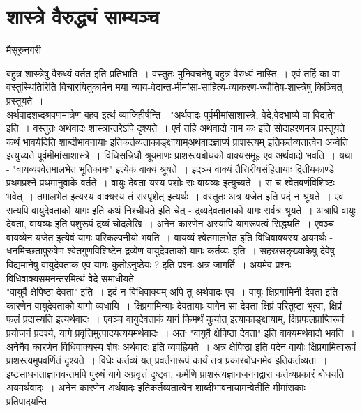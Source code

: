 {\fontsize{15}{17}\selectfont
\presetvalues
\chapter{शास्त्रे वैरुद्ध्यं साम्यञ्च} 

\begin{center}
\smallskip

मैसूरुनगरी
\addrule
\end{center}

बहुत्र शास्त्रेषु वैरुध्यं वर्तत इति प्रतिभाति~। वस्तुतः मुनिवचनेषु बहुत्र वैरुध्यं नास्ति~। एवं तर्हि का वा वस्तुस्थितिरिति विचारयितुकामेन मया  न्याय-वेदान्त-मीमांसा-साहित्य-व्याकरण-ज्यौतिष-शास्त्रेषु किञ्चित् प्रस्तूयते~। 
~\\[0.2cm]
अर्थवादशब्दश्रवणमात्रेण बहव इत्थं व्याजिहीर्षन्ति - "अर्थवादः पूर्वमीमांसाशास्त्रे, वेदे,\break वेदभाष्ये वा विद्यते" इति~। वस्तुतः अर्थवादः शास्त्रान्तरेऽपि दृश्यते~। एवं तर्हि अर्थवादो नाम कः इति सोदाहरणमत्र प्रस्तूयते~। कथं भावयेदिति शाब्दीभावनायाः इतिकर्तव्यताकाङ्क्षायाम्\break अर्थवादज्ञाप्यं प्राशस्त्यम् इतिकर्तव्यतात्वेन अन्वेति इत्युच्यते पूर्वमीमांसाशास्त्रे~। विधिसन्निधौ श्रूयमाणः प्राशस्त्यबोधको वाक्यसमूह एव अर्थवादो भवति~। यथा - "वायव्यं\break श्वेतमालभेत भूतिकामः" इत्येकं वाक्यं श्रूयते~। इदञ्च वाक्यं तैत्तिरीयसंहितायाः द्वितीयकाण्डे प्रथमप्रश्ने प्रथमानुवाके वर्तते~। वायुः देवता यस्य पशोः सः वायव्यः इत्युच्यते~। स च श्वेतवर्णविशिष्टः भवेत्~। तमालभेत इत्यस्य वाक्यस्य तं संस्पृशेत् इत्यर्थः~। वस्तुतः अत्र यजेत इति पदं न \hbox{श्रूयते~।} एवं सत्यपि वायुदेवताको यागः इति कथं निश्चीयते इति चेत् - द्रव्यदेवतात्मको यागः सर्वत्र श्रूयते~। अत्रापि वायुः देवता, वायव्यः इति पशुरूपं द्रव्यं चोदलेखि~। अनेन कारणेन अस्यापि यागरूपत्वं सिद्ध्यति~। एवञ्च वायव्येन यजेत इत्येवं यागः परिकल्पनीयो भवति~। वायव्यं श्वेतमालभेत इति विधिवाक्यस्य अयमर्थः - धनमिच्छता\break पुरुषेण श्वेतगुणविशिष्टेन द्रव्येण वायुदेवताको यागः कर्तव्यः इति~। सहस्रसङ्ख्याकेषु देवेषु विद्यमानेषु वायुदेवताक एव यागः कुतोऽनुष्ठेयः ? इति प्रश्नः अत्र जागर्ति~। अयमेव प्रश्नः विधिवाक्यसमनन्तरमित्थं वेदे समाधीयते-
~\\[0.2cm]
"वायुर्वै क्षेपिष्ठा देवता" इति~। इदं न विधिवाक्यम् अपि तु अर्थवादः एव~। वायुः क्षिप्रगामिनी देवता इति कारणेन वायुदेवताको यागो व्यधायि~। क्षिप्रगामिन्याः देवतायाः यागेन सा देवता क्षिप्रं परितुष्टा भूत्वा, क्षिप्रं फलं प्रदास्यति इत्यर्थवादः~। एवञ्च वायुदेवताकं यागं किमर्थं कुर्यात् इत्याकाङ्क्षायाम्, क्षिप्रफलप्राप्तिरूपं प्रयोजनं प्रदर्श्य, यागे प्रवृत्तिमुत्पादयत्ययमर्थवादः~। अतः "वायुर्वै क्षेपिष्ठा देवता" इति वाक्यमर्थवादो भवति~। अनेनैव कारणेन  विधिवाक्यस्य शेषः अर्थवादः इति व्यवह्रियते~। अत्र क्षेपिष्ठा इति पदेन वायोः क्षिप्रगामित्वरूपं प्राशस्त्यमुपवर्णितं दृश्यते~। विधेः कर्तव्यं यत् प्रवर्तनारूपं कार्यं तत्र प्रकारबोधनमेव इतिकर्तव्यता~। इष्टसाधनताज्ञानवन्तमपि पुरुषं यागे अप्रवृत्तं दृष्ट्वा, कर्मणि प्राशस्त्यज्ञानजननद्वारा कर्तव्यप्रकारं बोधयति अयमर्थवादः~। अनेन कारणेन अर्थवादः इतिकर्तव्यतात्वेन शाब्दीभावनायामन्वेतीति मीमांसकाः प्रतिपादयन्ति~। 
}
